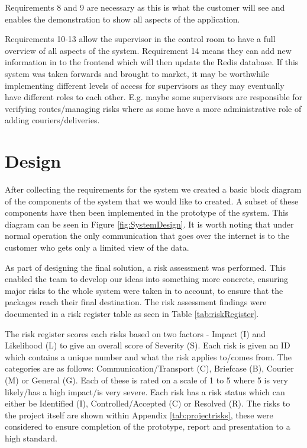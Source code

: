 Requirements 8 and 9 are necessary as this is what the customer will see and enables the demonstration to show all aspects of the application.

Requirements 10-13 allow the supervisor in the control room to have a full overview of all aspects of the system. Requirement 14 means they can add new information in to the frontend which will then update the Redis database. If this system was taken forwards and brought to market, it may be worthwhile implementing different levels of access for supervisors as they may eventually have different roles to each other. E.g. maybe some supervisors are responsible for verifying routes/managing risks where as some have a more administrative role of adding couriers/deliveries.

\section{Design}

After collecting the requirements for the system we created a basic block diagram of the components of the system that we would like to created. A subset of these components have then been implemented in the prototype of the system. This diagram can be seen in Figure \ref{fig:SystemDesign}. It is worth noting that under normal operation the only communication that goes over the internet is to the customer who gets only a limited view of the data. 

As part of designing the final solution, a risk assessment was performed. This enabled the team to develop our ideas into something more concrete, ensuring major risks to the whole system were taken in to account, to ensure that the packages reach their final destination. The risk assessment findings were documented in a risk register table as seen in Table \ref{tab:riskRegister}.

The risk register scores each risks based on two factors - Impact (I) and Likelihood (L) to give an overall score of Severity (S). Each risk is given an ID which contains a unique number and what the risk applies to/comes from. The categories are as follows: Communication/Transport (C), Briefcase (B), Courier  (M) or General (G). Each of these is rated on a scale of 1 to 5 where 5 is very likely/has a high impact/is very severe. Each risk has a risk status which can either be Identified (I), Controlled/Accepted (C) or Resolved (R). The risks to the project itself are shown within Appendix \ref{tab:projectrisks}, these were considered to ensure completion of the prototype, report and presentation to a high standard.


